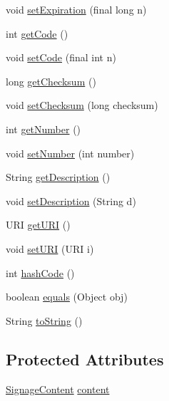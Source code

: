 \begin{DoxyCompactItemize}
\item 
void \hyperlink{classgov_1_1fnal_1_1ppd_1_1dd_1_1xml_1_1ChannelSpec_a2880efebb90446bef7c6f688bd20b7b1}{set\-Expiration} (final long n)
\item 
int \hyperlink{classgov_1_1fnal_1_1ppd_1_1dd_1_1xml_1_1ChannelSpec_aea7331dbc6aa67209d9a33c5c8d86468}{get\-Code} ()
\item 
void \hyperlink{classgov_1_1fnal_1_1ppd_1_1dd_1_1xml_1_1ChannelSpec_ac0d09ebac9464f3923193f3763e34521}{set\-Code} (final int n)
\item 
long \hyperlink{classgov_1_1fnal_1_1ppd_1_1dd_1_1xml_1_1ChannelSpec_a5ffaf23342954c53da3ece0b2f0321ff}{get\-Checksum} ()
\item 
void \hyperlink{classgov_1_1fnal_1_1ppd_1_1dd_1_1xml_1_1ChannelSpec_a4ff5d008129ace28d4aa8e78840da189}{set\-Checksum} (long checksum)
\item 
int \hyperlink{classgov_1_1fnal_1_1ppd_1_1dd_1_1xml_1_1ChannelSpec_ac1df7f3f044348cae3ddab88718272e3}{get\-Number} ()
\item 
void \hyperlink{classgov_1_1fnal_1_1ppd_1_1dd_1_1xml_1_1ChannelSpec_aa1d393c9393922f8de3982466251582f}{set\-Number} (int number)
\item 
String \hyperlink{classgov_1_1fnal_1_1ppd_1_1dd_1_1xml_1_1ChannelSpec_a69b4c6a07e6bad99c3bc1648c3fed93d}{get\-Description} ()
\item 
void \hyperlink{classgov_1_1fnal_1_1ppd_1_1dd_1_1xml_1_1ChannelSpec_a0104e505b8b30f58257561e3d65c1950}{set\-Description} (String d)
\item 
U\-R\-I \hyperlink{classgov_1_1fnal_1_1ppd_1_1dd_1_1xml_1_1ChannelSpec_afb522472056287c1a6f65dba7d410d81}{get\-U\-R\-I} ()
\item 
void \hyperlink{classgov_1_1fnal_1_1ppd_1_1dd_1_1xml_1_1ChannelSpec_ad7a23aa407de30f14c3546e67c560b38}{set\-U\-R\-I} (U\-R\-I i)
\item 
int \hyperlink{classgov_1_1fnal_1_1ppd_1_1dd_1_1xml_1_1ChannelSpec_ae1d5db64ed9feb11c5e95a21b55e789b}{hash\-Code} ()
\item 
boolean \hyperlink{classgov_1_1fnal_1_1ppd_1_1dd_1_1xml_1_1ChannelSpec_acd9ae95dee1e080486835368864a8bc1}{equals} (Object obj)
\item 
String \hyperlink{classgov_1_1fnal_1_1ppd_1_1dd_1_1xml_1_1ChannelSpec_adaeed632748105b2917236214f9b9042}{to\-String} ()
\end{DoxyCompactItemize}
\subsection*{Protected Attributes}
\begin{DoxyCompactItemize}
\item 
\hyperlink{interfacegov_1_1fnal_1_1ppd_1_1dd_1_1signage_1_1SignageContent}{Signage\-Content} \hyperlink{classgov_1_1fnal_1_1ppd_1_1dd_1_1xml_1_1ChannelSpec_a1da921017f2b68a1594a36e2be8f2365}{content}
\end{DoxyCompactItemize}


